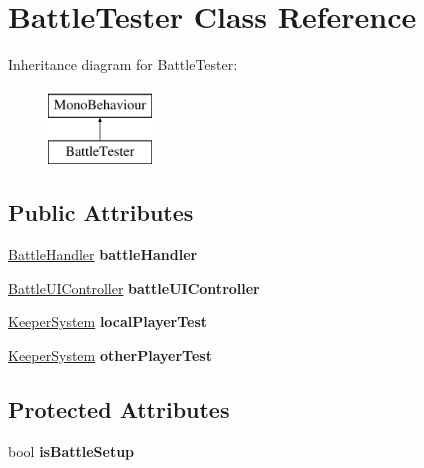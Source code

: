 \hypertarget{class_battle_tester}{\section{Battle\-Tester Class Reference}
\label{class_battle_tester}
}
Inheritance diagram for Battle\-Tester\-:\begin{figure}[H]
\begin{center}
\leavevmode
\includegraphics[height=2.000000cm]{class_battle_tester}
\end{center}
\end{figure}
\subsection*{Public Attributes}
\begin{DoxyCompactItemize}
\item 
\hypertarget{class_battle_tester_a87c03ddd5b47eb2881580fa62588660f}{\hyperlink{class_battle_handler}{Battle\-Handler} {\bfseries battle\-Handler}}\label{class_battle_tester_a87c03ddd5b47eb2881580fa62588660f}

\item 
\hypertarget{class_battle_tester_ab0a3a610e839111f2a5d460c9c140a1f}{\hyperlink{class_battle_u_i_controller}{Battle\-U\-I\-Controller} {\bfseries battle\-U\-I\-Controller}}\label{class_battle_tester_ab0a3a610e839111f2a5d460c9c140a1f}

\item 
\hypertarget{class_battle_tester_a6dbcbb9d54792303c253d24bbfa78f36}{\hyperlink{class_keeper_system}{Keeper\-System} {\bfseries local\-Player\-Test}}\label{class_battle_tester_a6dbcbb9d54792303c253d24bbfa78f36}

\item 
\hypertarget{class_battle_tester_a9469f951e3ad2344ec71675b51656bfc}{\hyperlink{class_keeper_system}{Keeper\-System} {\bfseries other\-Player\-Test}}\label{class_battle_tester_a9469f951e3ad2344ec71675b51656bfc}

\end{DoxyCompactItemize}
\subsection*{Protected Attributes}
\begin{DoxyCompactItemize}
\item 
\hypertarget{class_battle_tester_a39cd5d1c4a86ae22eb25d9a6d6674db9}{bool {\bfseries is\-Battle\-Setup}}\label{class_battle_tester_a39cd5d1c4a86ae22eb25d9a6d6674db9}

\end{DoxyCompactItemize}
